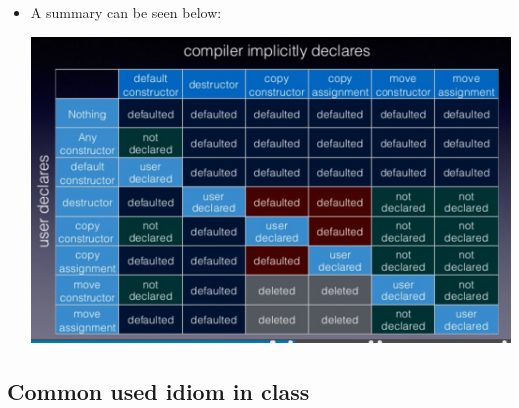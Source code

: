 \documentclass[a4paper,11pt,twoside]{book}
\begin{document}
\begin{itemize}
\item A summary can be seen below: \\
\begin{center}
	\includegraphics[scale=0.8]{pics/sm3.png} \newline
\end{center}


\end{itemize}



	



\subsection{Common used idiom in class}
\end{document}
